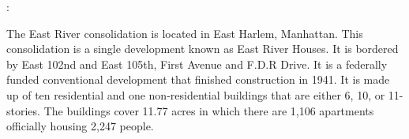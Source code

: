 :

The East River consolidation is located in East Harlem, Manhattan. This consolidation is a single development known as East River Houses. It is bordered by East 102nd and East 105th, First Avenue and F.D.R Drive. It is a federally funded conventional development that finished construction in 1941. It is made up of ten residential and one non-residential buildings that are either 6, 10, or 11-stories. The buildings cover 11.77 acres in which there are 1,106 apartments officially housing 2,247 people. 